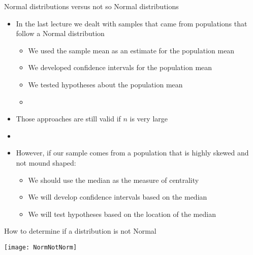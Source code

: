 \documentclass[xcolor=dvipsnames]{beamer}
\begin{document}
\begin{frame}{Normal distributions versus not so Normal distributions}
	\begin{itemize}
		\item In the last lecture we dealt with samples that came from populations that follow a Normal distribution
		\begin{itemize}
			\item We used the sample mean as an estimate for the population mean
			\item We developed confidence intervals for the population mean
			\item We tested hypotheses about the population mean
			\item[]
		\end{itemize}
		\item Those approaches are still valid if $n$ is very large
		\item[]
		\item However, if our sample comes from a population that is highly skewed and not mound shaped: 
		\begin{itemize}
			\item We should use the median as the measure of centrality
			\item We will develop confidence intervals based on the median
			\item We will test hypotheses based on the location of the median
		\end{itemize}
	\end{itemize}
\end{frame}

\begin{frame}{How to determine if a distribution is not Normal}
\begin{center}
	\texttt{[image: NormNotNorm]}
\end{center}
\end{frame}
\end{document}
